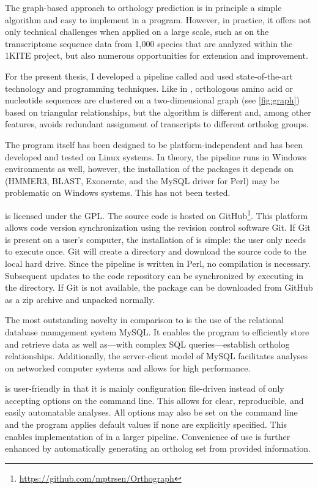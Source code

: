 The graph-based approach to orthology prediction is in principle a simple
algorithm and easy to implement in a program. However, in practice, it offers
not only technical challenges when applied on a large scale, such as on the
transcriptome sequence data from 1,000 species that are analyzed within the
1KITE project, but also numerous opportunities for extension and improvement. 

For the present thesis, I developed a pipeline called \pname and used
state-of-the-art technology and programming techniques. Like in \hamstr,
orthologous amino acid or nucleotide sequences are clustered on a
two-dimensional graph (see \autoref{fig:graph}) based on triangular
relationships, but the algorithm is different and, among other features, avoids
redundant assignment of transcripts to different ortholog groups.



The program itself has been designed to be platform-independent and has been
developed and tested on Linux systems.  In theory, the pipeline runs in Windows
environments as well, however, the installation of the packages it depends on
(HMMER3, BLAST, Exonerate, and the MySQL driver for Perl) may be problematic on
Windows systems. This has not been tested.

\pname is licensed under the GPL. The source code is hosted on
GitHub\footnote{\url{https://github.com/mptrsen/Orthograph}}. This platform
allows code version synchronization using the revision control software Git. If
Git is present on a user's computer, the installation of \pname is simple: the
user only needs to execute  once. Git will create a directory and
download the source code to the local hard drive. Since the pipeline is written
in Perl, no compilation is necessary. Subsequent updates to the code repository
can be synchronized by executing  in the \pname directory. If Git
is not available, the package can be downloaded from GitHub as a zip archive and
unpacked normally.

The most outstanding novelty in comparison to \hamstr is the use of the
relational database management system MySQL. It enables the program to
efficiently store and retrieve data as well as---with complex SQL
queries---establish ortholog relationships. Additionally, the server-client
model of MySQL facilitates analyses on networked computer systems and allows for
high performance.

\pname is user-friendly in that it is mainly configuration file-driven instead
of only accepting options on the command line. This allows for clear,
reproducible, and easily automatable analyses. All options may also be set on
the command line and the program applies default values if none are explicitly
specified. This enables implementation of \pname in a larger pipeline.
Convenience of use is further enhanced by automatically generating an ortholog
set from provided information.

